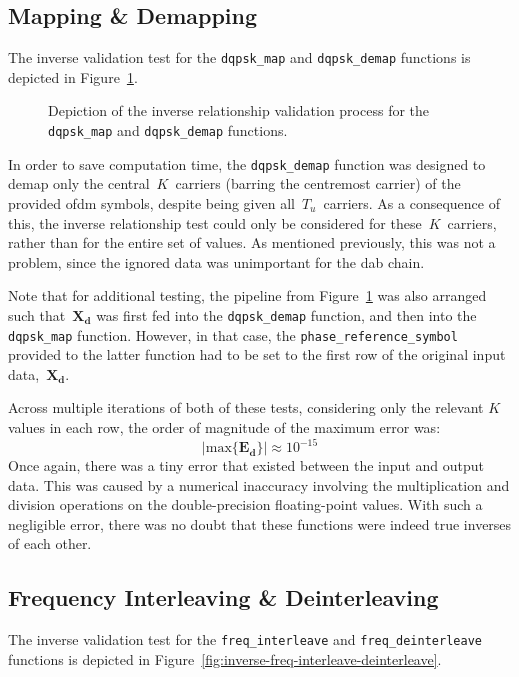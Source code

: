 \documentclass[class=report,11pt,crop=false]{standalone}
\begin{document}
\subsection{ Mapping \& Demapping}
The inverse validation test for the \texttt{dqpsk\_map} and \texttt{dqpsk\_demap} functions is depicted in Figure~\ref{fig:inverse-dqpsk-map-demap}.

\begin{figure}[htbp]
  \centering
  \captionsetup{type=figure}
  \def\svgwidth{0.95\linewidth}
  { %
      }
  \caption{Depiction of the inverse relationship validation process for the \texttt{dqpsk\_map} and \texttt{dqpsk\_demap} functions.}
  \label{fig:inverse-dqpsk-map-demap}
\end{figure}

In order to save computation time, the \texttt{dqpsk\_demap} function was designed to demap only the central~\(K\)~carriers (barring the centremost carrier) of the provided \gls{ofdm} symbols, despite being given all~\(T_u\)~carriers. As a consequence of this, the inverse relationship test could only be considered for these~\(K\)~carriers, rather than for the entire set of values. As mentioned previously, this was not a problem, since the ignored data was unimportant for the \gls{dab} chain.

Note that for additional testing, the pipeline from Figure~\ref{fig:inverse-dqpsk-map-demap} was also arranged such that~\(\mathbf{X_d}\) was first fed into the \texttt{dqpsk\_demap} function, and then into the \texttt{dqpsk\_map} function. However, in that case, the \texttt{phase\_reference\_symbol} provided to the latter function had to be set to the first row of the original input data,~\(\mathbf{X_d}\).

Across multiple iterations of both of these tests, considering only the relevant \(K\) values in each row, the order of magnitude of the maximum error was:
\begin{equation}
  \left| \mathrm{max} \{ \mathbf{E_d} \} \right| \approx 10^{-15}
\end{equation}
Once again, there was a tiny error that existed between the input and output data. This was caused by a numerical inaccuracy involving the multiplication and division operations on the double-precision floating-point values. With such a negligible error, there was no doubt that these functions were indeed true inverses of each other.

\subsection{Frequency Interleaving \& Deinterleaving}
The inverse validation test for the \texttt{freq\_interleave} and \texttt{freq\_deinterleave} functions is depicted in Figure~\ref{fig:inverse-freq-interleave-deinterleave}.
\end{document}
